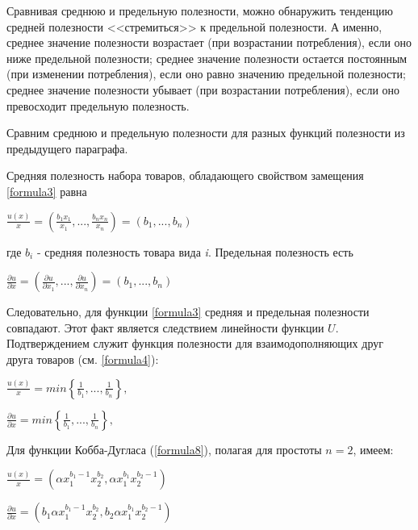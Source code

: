 \documentclass[12pt, 4paper]{book}
\begin{document}
{\par
Сравнивая среднюю и предельную полезности, можно обнаружить тенденцию средней полезности <<стремиться>> к предельной полезности. А именно, среднее значение полезности возрастает (при возрастании потребления), если оно ниже предельной полезности; среднее значение полезности остается постоянным (при изменении потребления), если оно равно значению предельной полезности; среднее значение полезности убывает (при возрастании потребления), если оно превосходит предельную полезность.
\par
Сравним среднюю и предельную полезности для разных функций полезности из предыдущего параграфа.
\par
Средняя полезность набора товаров, обладающего свойством замещения \ref{formula3} равна 
\begin{center}
$\frac{u(x)}{x}=\left(\frac{b_{1}x_{1}}{x_{1}},...,\frac{b_{n}x_{n}}{x_{n}}\right)=(b_{1},...,b_{n})$
\end{center}
\par
где $b_{i}$ - средняя полезность товара вида \textit{i}. Предельная полезность есть 
\begin{center}
$\frac{\partial u}{\partial x}=\left(\frac{\partial u}{\partial x_{1}},...,\frac{\partial u}{\partial x_{n}}\right)=(b_{1},...,b_{n})$
\end{center}
\par
Следовательно, для функции \ref{formula3} средняя и предельная полезности совпадают. Этот факт является следствием линейности функции $U$. Подтверждением служит функция полезности для взаимодополняющих друг друга товаров (см. \ref{formula4}): 
\begin{center}
$\frac{u(x)}{x}=min\left\{\frac{1}{b_{1}},...,\frac{1}{b_{n}}\right\},$
\end{center}
\begin{center}
$\frac{\partial u}{\partial x}=min\left\{\frac{1}{b_{1}},...,\frac{1}{b_{n}}\right\},$
\end{center}
\par
Для функции Кобба-Дугласа (\ref{formula8}), полагая для простоты $n=2$, имеем: 
\begin{center}
$\frac{u(x)}{x}=\left( \alpha x_{1}^{b_{1}-1}x_{2}^{b_{2}},\alpha x_{1}^{b_{1}}x_{2}^{b_{2}-1}\right)$
\end{center}
\par
\begin{center}
$\frac{\partial u}{\partial x}=\left(b_{1} \alpha x_{1}^{b_{1}-1}x_{2}^{b_{2}},b_{2} \alpha x_{1}^{b_{1}}x_{2}^{b_{2}-1}\right)$

\end{center}}
\end{document}
